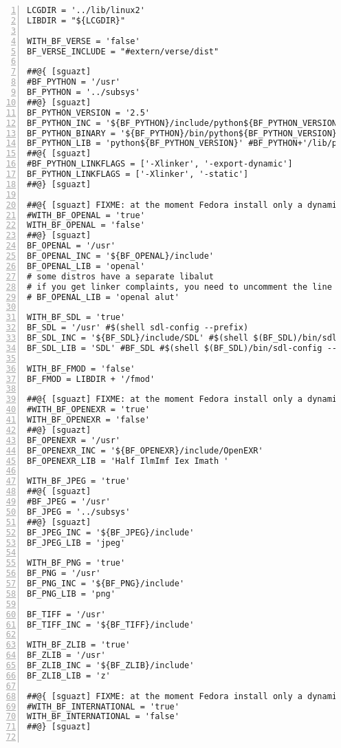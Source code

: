 \begin{lstlisting}[basicstyle={\small\ttfamily},breaklines=true,frame=single,numbers=left]
LCGDIR = '../lib/linux2'
LIBDIR = "${LCGDIR}"

WITH_BF_VERSE = 'false'
BF_VERSE_INCLUDE = "#extern/verse/dist"

##@{ [sguazt]
#BF_PYTHON = '/usr'
BF_PYTHON = '../subsys'
##@} [sguazt]
BF_PYTHON_VERSION = '2.5'
BF_PYTHON_INC = '${BF_PYTHON}/include/python${BF_PYTHON_VERSION}'
BF_PYTHON_BINARY = '${BF_PYTHON}/bin/python${BF_PYTHON_VERSION}'
BF_PYTHON_LIB = 'python${BF_PYTHON_VERSION}' #BF_PYTHON+'/lib/python'+BF_PYTHON_VERSION+'/config/libpython'+BF_PYTHON_VERSION+'.a'
##@{ [sguazt]
#BF_PYTHON_LINKFLAGS = ['-Xlinker', '-export-dynamic']
BF_PYTHON_LINKFLAGS = ['-Xlinker', '-static']
##@} [sguazt]

##@{ [sguazt] FIXME: at the moment Fedora install only a dynamic version of OPENAL/OPENAL-ALUT
#WITH_BF_OPENAL = 'true'
WITH_BF_OPENAL = 'false'
##@} [sguazt]
BF_OPENAL = '/usr'
BF_OPENAL_INC = '${BF_OPENAL}/include'
BF_OPENAL_LIB = 'openal'
# some distros have a separate libalut
# if you get linker complaints, you need to uncomment the line below
# BF_OPENAL_LIB = 'openal alut'  

WITH_BF_SDL = 'true'
BF_SDL = '/usr' #$(shell sdl-config --prefix)
BF_SDL_INC = '${BF_SDL}/include/SDL' #$(shell $(BF_SDL)/bin/sdl-config --cflags)
BF_SDL_LIB = 'SDL' #BF_SDL #$(shell $(BF_SDL)/bin/sdl-config --libs) -lSDL_mixer

WITH_BF_FMOD = 'false'
BF_FMOD = LIBDIR + '/fmod'

##@{ [sguazt] FIXME: at the moment Fedora install only a dynamic version of OpenEXR
#WITH_BF_OPENEXR = 'true'
WITH_BF_OPENEXR = 'false'
##@} [sguazt]
BF_OPENEXR = '/usr'
BF_OPENEXR_INC = '${BF_OPENEXR}/include/OpenEXR'
BF_OPENEXR_LIB = 'Half IlmImf Iex Imath '

WITH_BF_JPEG = 'true'
##@{ [sguazt]
#BF_JPEG = '/usr'
BF_JPEG = '../subsys'
##@} [sguazt]
BF_JPEG_INC = '${BF_JPEG}/include'
BF_JPEG_LIB = 'jpeg'

WITH_BF_PNG = 'true'
BF_PNG = '/usr'
BF_PNG_INC = '${BF_PNG}/include'
BF_PNG_LIB = 'png'

BF_TIFF = '/usr'
BF_TIFF_INC = '${BF_TIFF}/include'

WITH_BF_ZLIB = 'true'
BF_ZLIB = '/usr'
BF_ZLIB_INC = '${BF_ZLIB}/include'
BF_ZLIB_LIB = 'z'

##@{ [sguazt] FIXME: at the moment Fedora install only a dynamic version of gettextlib
#WITH_BF_INTERNATIONAL = 'true'
WITH_BF_INTERNATIONAL = 'false'
##@} [sguazt]


\end{lstlisting}
